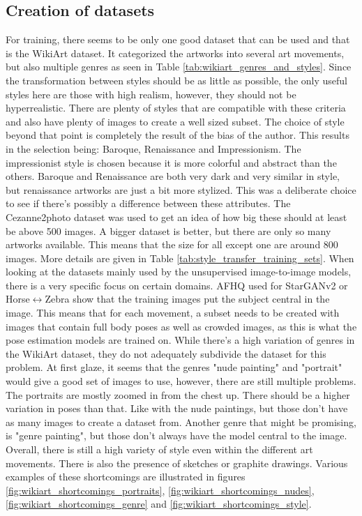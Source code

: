 \subsection{Creation of datasets}
\label{sec:baseline_dataset_style_transfer}
For training, there seems to be only one good dataset that can be used and that is the WikiArt dataset.
It categorized the artworks into several art movements, but also multiple genres as seen in Table \ref{tab:wikiart_genres_and_styles}.
Since the transformation between styles should be as little as possible, the only useful styles here are those with high realism, however, they should not be hyperrealistic.
There are plenty of styles that are compatible with these criteria and also have plenty of images to create a well sized subset.
The choice of style beyond that point is completely the result of the bias of the author.
This results in the selection being: Baroque, Renaissance and Impressionism.
The impressionist style is chosen because it is more colorful and abstract than the others.
Baroque and Renaissance are both very dark and very similar in style, but renaissance artworks are just a bit more stylized.
This was a deliberate choice to see if there's possibly a difference between these attributes.
The Cezanne2photo dataset \cite{Zhu2017} was used to get an idea of how big these should at least be above 500 images.
A bigger dataset is better, but there are only so many artworks available.
This means that the size for all except one are around 800 images.
More details are given in Table \ref{tab:style_transfer_training_sets}.
When looking at the datasets mainly used by the unsupervised image-to-image models, there is a very specific focus on certain domains.
\gls{AFHQ} used for StarGANv2 or Horse$\leftrightarrow$Zebra show that the training images put the subject central in the image.
This means that for each movement, a subset needs to be created with images that contain full body poses as well as crowded images, as this is what the pose estimation models are trained on.
While there's a high variation of genres in the WikiArt dataset, they do not adequately subdivide the dataset for this problem.
At first glaze, it seems that the genres "nude painting" and "portrait" would give a good set of images to use, however, there are still multiple problems.
The portraits are mostly zoomed in from the chest up.
There should be a higher variation in poses than that.
Like with the nude paintings, but those don't have as many images to create a dataset from.
Another genre that might be promising, is "genre painting", but those don't always have the model central to the image.
Overall, there is still a high variety of style even within the different art movements.
There is also the presence of sketches or graphite drawings.
Various examples of these shortcomings are illustrated in figures \ref{fig:wikiart_shortcomings_portraits}, \ref{fig:wikiart_shortcomings_nudes}, \ref{fig:wikiart_shortcomings_genre} and \ref{fig:wikiart_shortcomings_style}.

